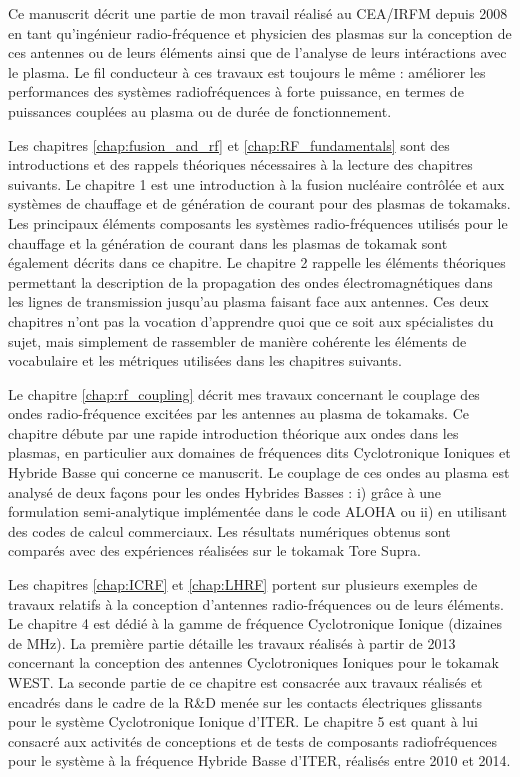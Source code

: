 Ce manuscrit décrit une partie de mon travail réalisé au CEA/IRFM depuis 2008 en tant qu'ingénieur radio-fréquence et physicien des plasmas sur la conception de ces antennes ou de leurs éléments ainsi que de l'analyse de leurs intéractions avec le plasma. Le fil conducteur à ces travaux est toujours le même : améliorer les performances des systèmes radiofréquences à forte puissance, en termes de puissances couplées au plasma ou de durée de fonctionnement.
 

Les chapitres \ref{chap:fusion_and_rf} et \ref{chap:RF_fundamentals} sont des introductions et des rappels théoriques nécessaires à la lecture des chapitres suivants. Le chapitre 1 est une introduction à la fusion nucléaire contrôlée et aux systèmes de chauffage et de génération de courant pour des plasmas de tokamaks. Les principaux éléments composants les systèmes radio-fréquences utilisés pour le chauffage et la génération de courant dans les plasmas de tokamak sont également décrits dans ce chapitre. Le chapitre 2 rappelle les éléments théoriques permettant la description de la propagation des ondes électromagnétiques dans les lignes de transmission jusqu'au plasma faisant face aux antennes. Ces deux chapitres n'ont pas la vocation d'apprendre quoi que ce soit aux spécialistes du sujet, mais simplement de rassembler de manière cohérente les éléments de vocabulaire et les métriques utilisées dans les chapitres suivants.

Le chapitre \ref{chap:rf_coupling} décrit mes travaux concernant le couplage des ondes radio-fréquence excitées par les antennes au plasma de tokamaks. Ce chapitre débute par une rapide introduction théorique aux ondes dans les plasmas, en particulier aux domaines de fréquences dits Cyclotronique Ioniques et Hybride Basse qui concerne ce manuscrit. Le couplage de ces ondes au plasma est analysé de deux façons pour les ondes Hybrides Basses : i) grâce à une formulation semi-analytique implémentée dans le code ALOHA ou ii) en utilisant des codes de calcul commerciaux. Les résultats numériques obtenus sont comparés avec  des expériences réalisées sur le tokamak Tore Supra.

Les chapitres \ref{chap:ICRF} et \ref{chap:LHRF} portent sur plusieurs exemples de travaux relatifs à la conception d'antennes radio-fréquences ou de leurs éléments. Le chapitre 4 est dédié à la gamme de fréquence Cyclotronique Ionique (dizaines de MHz). La première partie détaille les travaux réalisés à partir de 2013 concernant la conception des antennes Cyclotroniques Ioniques pour le tokamak WEST. La seconde partie de ce chapitre est consacrée aux travaux réalisés et encadrés dans le cadre de la R\&D menée sur les contacts électriques glissants pour le système Cyclotronique Ionique d'ITER. Le chapitre 5 est quant à lui consacré aux activités de conceptions et de tests de composants radiofréquences pour le système à la fréquence Hybride Basse d'ITER, réalisés entre 2010 et 2014.

